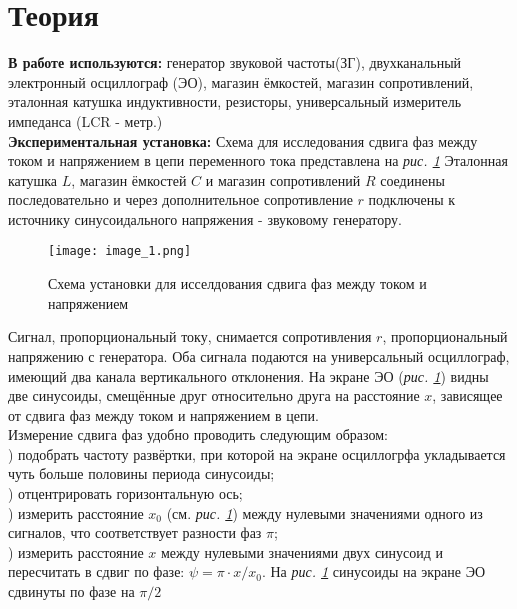 






\newpage
\section*{Теория}
\textbf{В работе используются:} генератор звуковой частоты(ЗГ), двухканальный электронный осциллограф (ЭО), магазин ёмкостей, магазин сопротивлений, эталонная катушка индуктивности, резисторы, универсальный измеритель импеданса (LCR - метр.) \\
\textbf{Экспериментальная установка:} Схема для исследования сдвига фаз между током и напряжением в цепи переменного тока представлена на \textit{рис. \ref{fig:image_1}} Эталонная катушка \textbf{$L$}, магазин ёмкостей \textbf{$C$} и магазин сопротивлений \textbf{$R$} соединены последовательно и через дополнительное сопротивление \textbf{$r$} подключены к источнику синусоидального напряжения - звуковому генератору. \\

\begin{figure}[h!]
	\centering
	\texttt{[image: image\_1.png]}
	\caption{Схема установки для исселдования сдвига фаз между током и напряжением}
	\label{fig:image_1}
\end{figure}

Сигнал, пропорциональный току, снимается сопротивления $ r $, пропорциональный напряжению с генератора. Оба сигнала подаются на универсальный осциллограф, имеющий два канала вертикального отклонения. На экране ЭО (\textit{рис. \ref{fig:image_1}}) видны две синусоиды, смещённые друг относительно друга на расстояние $ x $, зависящее от сдвига фаз между током и напряжением в цепи. \\

\indent Измерение сдвига фаз удобно проводить следующим образом:\\
) подобрать частоту развёртки, при которой на экране осциллогрфа укладывается чуть больше половины периода синусоиды;\\
) отцентрировать горизонтальную ось;\\
) измерить расстояние $x_0$ (см. \textit{рис. \ref{fig:image_1}}) между нулевыми значениями одного из сигналов, что соответствует разности фаз $\pi$;\\
) измерить расстояние $ x $ между нулевыми значениями двух синусоид и
пересчитать в сдвиг по фазе: $\psi = \pi \cdot x / x_0$. На \textit{рис. \ref{fig:image_1}} синусоиды на экране ЭО
сдвинуты по фазе на $\pi/2$\\

